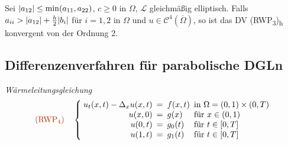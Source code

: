 \documentclass{cheat-sheet}
\newcommand{\Cont}{\mathcal{C}} %
\newcommand{\clos}[1]{\overline{#1}} %
\newcommand{\cOmega}{\clos{\Omega}} %
\newcommand{\LL}{\mathcal{L}} %
\newcommand{\Laplace}{\Delta}
\newcommand{\tss}[1]{\textsubscript{#1}} %
\newcommand{\probl}[1]{\textcolor{ProblemColor}{#1}}
\begin{document}

\begin{satz}
  Sei $\lvert a_{12}\rvert \leq \min(a_{11}, a_{22})$, $c \geq 0$ in $\Omega$, $\LL$ gleichmäßig elliptisch.
  Falls $a_{ii} > \lvert a_{12}\rvert + \tfrac{h}{2} \lvert b_i\rvert$ für $i = 1, 2$ in $\Omega$ und $u \in \Cont^4(\cOmega)$, so ist das DV (RWP\tss{3})\tss{h} konvergent von der Ordnung 2.
\end{satz}

\subsection{Differenzenverfahren für parabolische DGLn}

\begin{prob}
  \emph{Wärmeleitungsgleichung}
  \[
    \arraycolsep=2.5pt
    \text{\probl{(RWP\tss{4})}} \quad
    \left\{ \begin{array}{rcll}
      u_t(x,t) - \Laplace_x u(x, t) &=& f(x,t) &\text{in $\Omega = \ointerval{0}{1} \times \ointerval{0}{T}$} \\
      u(x,0) &=& g(x) & \text{für } x \in \ointerval{0}{1} \\
      u(0, t) &=& g_0(t) & \text{für } t \in \cinterval{0}{T} \\
      u(1, t) &=& g_1(t) & \text{für } t \in \cinterval{0}{T}
    \end{array} \right.
  \]
\end{prob}
\end{document}
